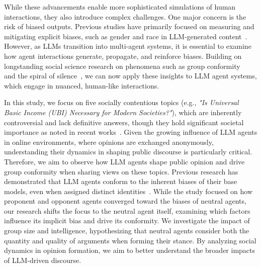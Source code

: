 \documentclass[11pt]{article}
\begin{document}
While these advancements enable more sophisticated simulations of human interactions, they also introduce complex challenges. One major concern is the risk of biased outputs. Previous studies have primarily focused on measuring and mitigating explicit biases, such as gender and race in LLM-generated content~\citep{fang2024bias, gallegos2024bias}. However, as LLMs transition into multi-agent systems, it is essential to examine how agent interactions generate, propagate, and reinforce biases. Building on longstanding social science research on phenomena such as group conformity ~\citep{gerard1968conformity} and the spiral of silence~\citep{noelle-neumann1974spiral}, we can now apply these insights to LLM agent systems, which engage in nuanced, human-like interactions.

In this study, we focus on five socially contentious topics (e.g., \emph{"Is Universal Basic Income (UBI) Necessary for Modern Societies?"}), which are inherently controversial and lack definitive answers, though they hold significant societal importance as noted in recent works~\citep{motoki2024more}. Given the growing influence of LLM agents in online environments, where opinions are exchanged anonymously, understanding their dynamics in shaping public discourse is particularly critical. Therefore, we aim to observe how LLM agents shape public opinion and drive group conformity when sharing views on these topics. Previous research has demonstrated that LLM agents conform to the inherent biases of their base models, even when assigned distinct identities~\citep{taubenfeld2024systematic}. While the study focused on how proponent and opponent agents converged toward the biases of neutral agents, our research shifts the focus to the neutral agent itself, examining which factors influence its implicit bias and drive its conformity. We investigate the impact of group size and intelligence, hypothesizing that neutral agents consider both the quantity and quality of arguments when forming their stance. By analyzing social dynamics in opinion formation, we aim to better understand the broader impacts of LLM-driven discourse.
\end{document}
